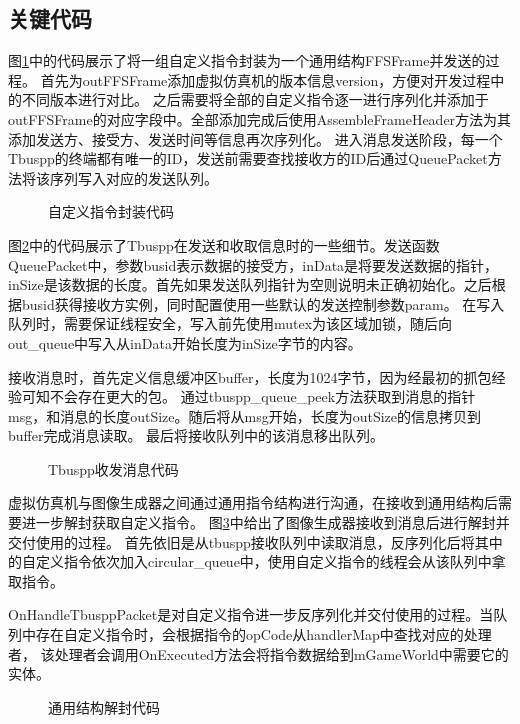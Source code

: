 \subsection{关键代码}
图\ref{IGsend}中的代码展示了将一组自定义指令封装为一个通用结构FFSFrame并发送的过程。
首先为outFFSFrame添加虚拟仿真机的版本信息version，方便对开发过程中的不同版本进行对比。
之后需要将全部的自定义指令逐一进行序列化并添加于outFFSFrame的对应字段中。全部添加完成后使用AssembleFrameHeader方法为其添加发送方、接受方、发送时间等信息再次序列化。
进入消息发送阶段，每一个Tbuspp的终端都有唯一的ID，发送前需要查找接收方的ID后通过QueuePacket方法将该序列写入对应的发送队列。
\begin{figure}[htb]
    \begin{center}
        
        \caption{自定义指令封装代码}
        \label{IGsend}
    \end{center}
\end{figure}
\par
图\ref{tbusio}中的代码展示了Tbuspp在发送和收取信息时的一些细节。发送函数QueuePacket中，参数busid表示数据的接受方，inData是将要发送数据的指针，
inSize是该数据的长度。首先如果发送队列指针为空则说明未正确初始化。之后根据busid获得接收方实例，同时配置使用一些默认的发送控制参数param。
在写入队列时，需要保证线程安全，写入前先使用mutex为该区域加锁，随后向out\_queue中写入从inData开始长度为inSize字节的内容。
\par
接收消息时，首先定义信息缓冲区buffer，长度为1024字节，因为经最初的抓包经验可知不会存在更大的包。
通过tbuspp\_queue\_peek方法获取到消息的指针msg，和消息的长度outSize。随后将从msg开始，长度为outSize的信息拷贝到buffer完成消息读取。
最后将接收队列中的该消息移出队列。
\begin{figure}[htb]
    \begin{center}
        
        \caption{Tbuspp收发消息代码}
        \label{tbusio}
    \end{center}
\end{figure}
\par
虚拟仿真机与图像生成器之间通过通用指令结构进行沟通，在接收到通用结构后需要进一步解封获取自定义指令。
图\ref{IGrecv}中给出了图像生成器接收到消息后进行解封并交付使用的过程。
首先依旧是从tbuspp接收队列中读取消息，反序列化后将其中的自定义指令依次加入circular\_queue中，使用自定义指令的线程会从该队列中拿取指令。
\par
OnHandleTbusppPacket是对自定义指令进一步反序列化并交付使用的过程。当队列中存在自定义指令时，会根据指令的opCode从handlerMap中查找对应的处理者，
该处理者会调用OnExecuted方法会将指令数据给到mGameWorld中需要它的实体。
\begin{figure}[htb]
    \begin{center}
        
        \caption{通用结构解封代码}
        \label{IGrecv}
    \end{center}
\end{figure}


